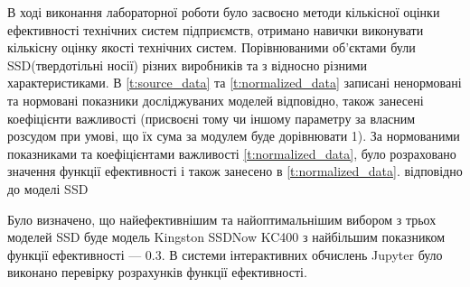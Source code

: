В ході виконання лабораторної роботи було засвоєно методи кількісної оцінки ефективності технічних
систем підприємств, отримано навички виконувати кількісну оцінку якості технічних
систем. Порівнюваними об’єктами були SSD(твердотільні носії) різних виробників та з відносно різними
характеристиками. В \ref{t:source_data} та \ref{t:normalized_data} записані ненормовані та нормовані
показники досліджуваних моделей відповідно, також занесені коефіцієнти важливості (присвоєні тому чи
іншому параметру за власним розсудом при умові, що їх сума за модулем буде дорівнювати 1). За
нормованими показниками та коефіцієнтами важливості \ref{t:normalized_data}, було розраховано значення
функції ефективності і також занесено в \ref{t:normalized_data}. відповідно до моделі SSD

Було визначено, що найефективнішим та найоптимальнішим вибором з трьох моделей SSD буде модель
Kingston SSDNow KC400 з найбільшим показником функції ефективності --- $0.3$. В системи
інтерактивних обчислень Jupyter було виконано перевірку розрахунків функції ефективності.
